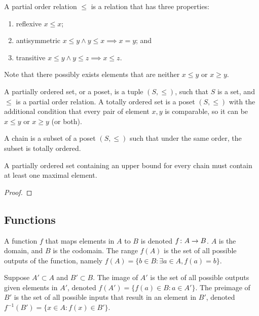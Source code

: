 \begin{definition}
    A partial order relation \(\leq\) is a relation that has three properties:
    \begin{enumerate}[label={(\roman*)}, itemsep=0mm]
        \item reflexive \(x \leq x\);
        \item antisymmetric \(x \leq y \land y \leq x \implies x = y\); and
        \item transitive \(x \leq y \land y \leq z \implies x \leq z\).
    \end{enumerate}
    Note that there possibly exists elements
    that are neither \(x \leq y\) or \(x \geq y\).
\end{definition}
\begin{definition}
    A partially ordered set, or a poset,
    is a tuple \((S,\leq)\),
    such that \(S\) is a set,
    and \(\leq\) is a partial order relation.
    A totally ordered set is a poset \((S,\leq)\)
    with the additional condition that every pair of element \(x,y\) is comparable,
    so it can be \(x \leq y\) or \(x \geq y\) (or both).
\end{definition}
\begin{definition}
    A chain is a subset of a poset \((S,\leq)\)
    such that under the same order, the subset is totally ordered.
\end{definition}
\begin{lemma}
    A partially ordered set containing an upper bound for every chain
    must contain at least one maximal element.
\end{lemma}
\begin{proof}
\end{proof}


\subsection{Functions}

\begin{definition}
    A function \(f\) that maps elements in \(A\) to \(B\)
    is denoted \(f\colon A\to B\).
    \(A\) is the domain, and \(B\) is the codomain.
    The range \(f(A)\) is the set of all possible outputs of the function,
    namely \(f(A) = \{b \in B : \exists a \in A, f(a) = b\}\).
\end{definition}

\begin{definition}
    Suppose \(A' \subset A\) and \(B' \subset B\).
    The image of \(A'\) is the set of all possible outputs
    given elements in \(A'\),
    denoted \(f(A') = \{f(a) \in B : a \in A'\}\).
    The preimage of \(B'\) is the set of all possible inputs
    that result in an element in \(B'\),
    denoted \(f^{-1}(B') = \{x \in A : f(x) \in B'\}\).
\end{definition}

